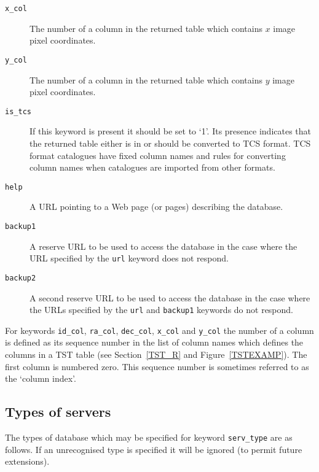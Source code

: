 \documentclass[twoside,11pt,nolof,chapters]{starlink}
\begin{document}
\begin{description}
  \item[\texttt{x\_col}] The number of a column in the returned table
   which contains $x$\/ image pixel coordinates.

  \item[\texttt{y\_col}] The number of a column in the returned table
   which contains $y$\/ image pixel coordinates.

  \item[\texttt{is\_tcs}] If this keyword is present it should be set to
   `1'.  Its presence indicates that the returned table either is in or
   should be converted to TCS format.  TCS format catalogues have fixed
   column names and rules for converting column names when catalogues
   are imported from other formats.

  \item[\texttt{help}] A URL pointing to a Web page (or pages) describing
   the database.

  \item[\texttt{backup1}] A reserve URL to be used to access the database
   in the case where the URL specified by the \texttt{url} keyword does
   not respond.

  \item[\texttt{backup2}] A second reserve URL to be used to access the
   database in the case where the URLs specified by the \texttt{url} and
   \texttt{backup1} keywords do not respond.

\end{description}

For keywords \texttt{id\_col}, \texttt{ra\_col}, \texttt{dec\_col}, \texttt{x\_col}
and \texttt{y\_col} the number of a column is defined as its sequence
number in the list of column names which defines the columns in a TST
table (see Section~\ref{TST_R} and Figure~\ref{TSTEXAMP}).  The first
column is numbered zero.  This sequence number is sometimes referred
to as the `column index'.

\subsection{\label{SERVERS_R}Types of servers}

The types of database which may be specified for keyword \texttt{serv\_type}
are as follows.  If an unrecognised type is specified it will be ignored
(to permit future extensions).
\end{document}
